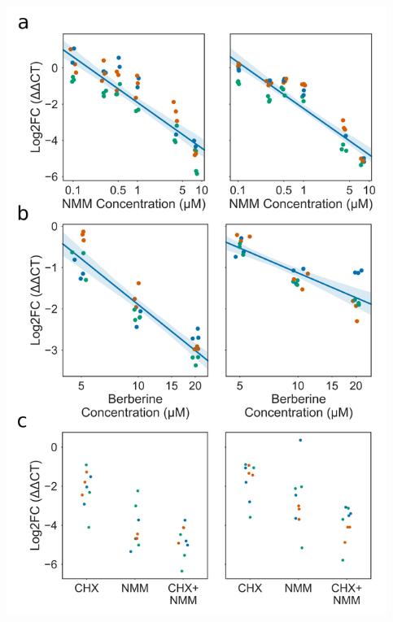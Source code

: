 \documentclass[12pt,a4paper,]{report}
\let\origfigure=\figure
\let\endorigfigure=\endfigure
\renewenvironment{figure}[1][2] {
    \expandafter\origfigure\expandafter[H]
} {
    \endorigfigure
}
\begin{document}
\newpage

\begin{figure}[htbp]
\centering
\includegraphics[width=\textwidth,height=562pt,keepaspectratio]{chapter_6/figures/ext13_lrx1_qpcr.png}
\caption[Expression of EXT13 and LRX1 during treatment with G4-binding ligands]{\textbf{Expression   of   EXT13   and   LRX1   during   treatment   with   G4-binding   ligands}   Scatter/strip   plots   showing   qPCR   results   for   EXT13   (left   panels)   and   LRX1   (right   panels).   Log2   fold   change   in   expression   (ΔΔCT)   of   Extensin   genes   decreases   with   increasing   concentrations   of   \textbf{a)}   NMM   and   \textbf{b)}   Berberine.   \textbf{c)}   NMM   downreguation   of   EXT13   and   LRX1   is   not   affected   by   concurrent   Cyclohexamide   treatment,   suggesting   a   mechanism   independent   of   translation.   For   all   panels,   each   point   is   a   single   technical   replicate,   and   colours   represent   different   biological   replicates.   A   small   amount   of   jitter   has   been   added   to   the   X   axis   for   better   visualisation   of   results.   \label{nmm_berb_qpcr}}
\end{figure}
\end{document}
